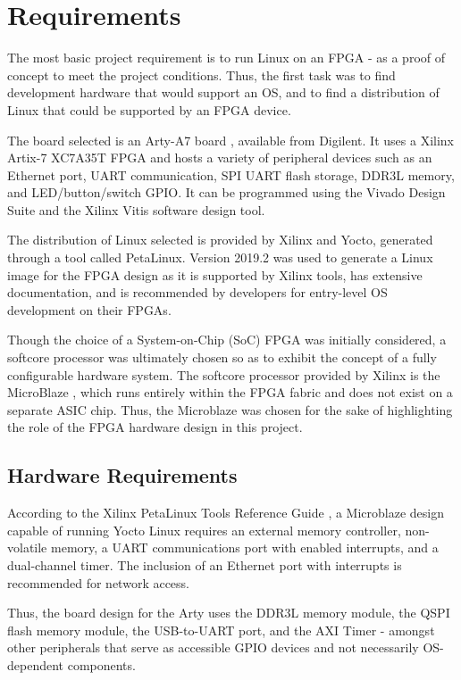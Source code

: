 \documentclass{article}
\begin{document}
\section{Requirements}
The most basic project requirement is to run Linux on an FPGA - as a proof of concept to meet the project conditions. Thus, the first task was to find development hardware that would support an OS, and to find a distribution of Linux that could be supported by an FPGA device.\par
The board selected is an Arty-A7 board \cite{arty_board}, available from Digilent. It uses a Xilinx Artix-7 XC7A35T FPGA and hosts a variety of peripheral devices such as an Ethernet port, UART communication, SPI UART flash storage, DDR3L memory, and LED/button/switch GPIO. It can be programmed using the Vivado Design Suite and the Xilinx Vitis software design tool.\par
The distribution of Linux selected is provided by Xilinx and Yocto, generated through a tool called PetaLinux. Version 2019.2 was used to generate a Linux image for the FPGA design as it is supported by Xilinx tools, has extensive documentation, and is recommended by developers for entry-level OS development on their FPGAs.\par
Though the choice of a System-on-Chip (SoC) FPGA was initially considered, a softcore processor was ultimately chosen so as to exhibit the concept of a fully configurable hardware system. The softcore processor provided by Xilinx is the MicroBlaze \cite{microblaze}, which runs entirely within the FPGA fabric and does not exist on a separate ASIC chip. Thus, the Microblaze was chosen for the sake of highlighting the role of the FPGA hardware design in this project.\par 

\subsection{Hardware Requirements}
According to the Xilinx PetaLinux Tools Reference Guide \cite{petalinux-docs}, a Microblaze design capable of running Yocto Linux requires an external memory controller, non-volatile memory, a UART communications port with enabled interrupts, and a dual-channel timer. The inclusion of an Ethernet port with interrupts is recommended for network access.\par
Thus, the board design for the Arty uses the DDR3L memory module, the QSPI flash memory module, the USB-to-UART port, and the AXI Timer - amongst other peripherals that serve as accessible GPIO devices and not necessarily OS-dependent components.\par
\end{document}
